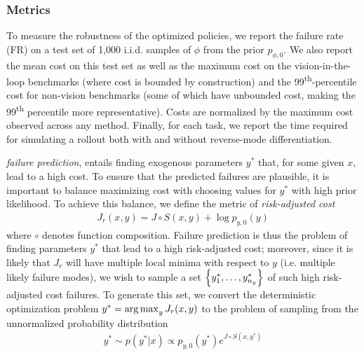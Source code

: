{\subsubsection{Metrics}

To measure the robustness of the optimized policies, we report the failure rate (FR) on a test set of 1,000 i.i.d. samples of $\phi$ from the prior $p_{\phi, 0}$. We also report the mean cost on this test set as well as the maximum cost on the vision-in-the-loop benchmarks (where cost is bounded by construction) and the 99\textsuperscript{th}-percentile cost for non-vision benchmarks (some of which have unbounded cost, making the 99\textsuperscript{th} percentile more representative). Costs are normalized by the maximum cost observed across any method. Finally, for each task, we report the time required for simulating a rollout both with and without reverse-mode differentiation.


\textit{failure prediction}, entails finding exogenous parameters $y^*$ that, for some given $x$, lead to a high cost. To ensure that the predicted failures are plausible, it is important to balance maximizing cost with choosing values for $y^*$ with high prior likelihood. To achieve this balance, we define the metric of \textit{risk-adjusted cost}
\begin{align}
    J_r(x, y) = J \circ S(x, y) + \log p_{y, 0}(y)
\end{align}
where $\circ$ denotes function composition. Failure prediction is thus the problem of finding parameters $y^*$ that lead to a high risk-adjusted cost; moreover, since it is likely that $J_r$ will have multiple local minima with respect to $y$ (i.e. multiple likely failure modes), we wish to sample a set $\left\{y^*_1, \ldots, y^*_{n_y}\right\}$ of such high risk-adjusted cost failures. To generate this set, we convert the deterministic optimization problem $y^* = \operatorname*{arg\,max}_y J_r(x, y)$ to the problem of sampling from the unnormalized probability distribution
\begin{align}
    y^* \sim p(y^* | x) \propto p_{y, 0}(y^*) e^{J \circ S(x, y^*)} \label{ch:corl:eq:prediction_distribution}
\end{align}

}
